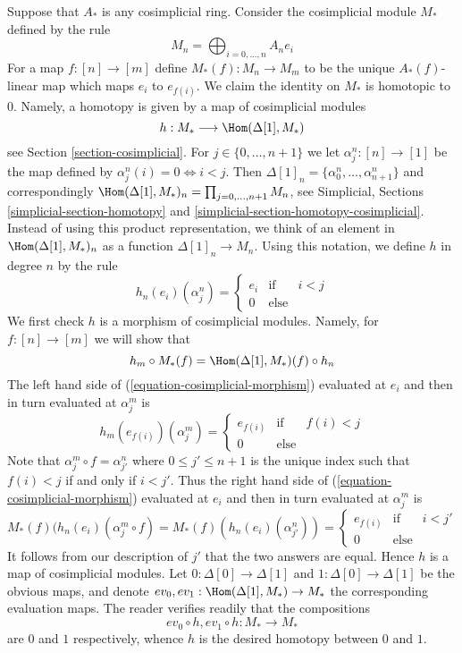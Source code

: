 \begin{example}
\label{example-cosimplicial-module}
Suppose that $A_*$ is any cosimplicial ring.
Consider the cosimplicial module $M_*$ defined by the rule
$$
M_n = \bigoplus\nolimits_{i = 0, ..., n} A_n e_i
$$
For a map $f : [n] \to [m]$ define $M_*(f) : M_n \to M_m$
to be the unique $A_*(f)$-linear map which maps $e_i$ to $e_{f(i)}$.
We claim the identity on $M_*$ is homotopic to $0$.
Namely, a homotopy is given by a map of cosimplicial modules
$$
h : M_* \longrightarrow \Hom(\Delta[1], M_*)
$$
see Section \ref{section-cosimplicial}.
For $j \in \{0, \ldots, n + 1\}$ we let $\alpha^n_j : [n] \to [1]$ be the map
defined by $\alpha^n_j(i) = 0 \Leftrightarrow i < j$. Then
$\Delta[1]_n = \{\alpha^n_0, \ldots, \alpha^n_{n + 1}\}$ and correspondingly
$\Hom(\Delta[1], M_*)_n = \prod_{j = 0, \ldots, n + 1} M_n$, see
Simplicial, Sections \ref{simplicial-section-homotopy} and
\ref{simplicial-section-homotopy-cosimplicial}. Instead of using
this product representation, we think of an element
in $\Hom(\Delta[1], M_*)_n$ as a function $\Delta[1]_n \to M_n$.
Using this notation, we define $h$ in degree $n$ by the rule
$$
h_n(e_i)(\alpha^n_j) =
\left\{
\begin{matrix}
e_{i} & \text{if} & i < j \\
0 & \text{else} 
\end{matrix}
\right.
$$
We first check $h$ is a morphism of cosimplicial modules. Namely, for
$f : [n] \to [m]$ we will show that
\begin{equation}
\label{equation-cosimplicial-morphism}
h_m \circ M_*(f) = \Hom(\Delta[1], M_*)(f) \circ h_n
\end{equation}
The left hand side of (\ref{equation-cosimplicial-morphism}) evaluated at
$e_i$ and then in turn evaluated at $\alpha^m_j$ is
$$
h_m(e_{f(i)})(\alpha^m_j) =
\left\{
\begin{matrix}
e_{f(i)} & \text{if} & f(i) < j \\
0 & \text{else}
\end{matrix}
\right.
$$
Note that $\alpha^m_j \circ f = \alpha^n_{j'}$ where
$0 \leq j' \leq n + 1$ is the unique index such that $f(i) < j$
if and only if $i < j'$. Thus the right hand side of
(\ref{equation-cosimplicial-morphism}) evaluated at $e_i$
and then in turn evaluated at $\alpha^m_j$ is
$$
M_*(f)(h_n(e_i)(\alpha^m_j \circ f) =
M_*(f)(h_n(e_i)(\alpha^n_{j'})) =
\left\{
\begin{matrix}
e_{f(i)} & \text{if} & i < j' \\
0 & \text{else} 
\end{matrix}
\right.
$$
It follows from our description of $j'$ that the two answers are equal.
Hence $h$ is a map of cosimplicial modules.
Let $0 : \Delta[0] \to \Delta[1]$ and
$1 : \Delta[0] \to \Delta[1]$ be the obvious maps, and denote
$ev_0, ev_1 : \Hom(\Delta[1], M_*) \to M_*$ the corresponding
evaluation maps. The reader verifies readily that
the compositions
$$
ev_0 \circ h, ev_1 \circ h : M_* \longrightarrow M_*
$$
are $0$ and $1$ respectively, whence $h$ is the desired homotopy between
$0$ and $1$.
\end{example}

